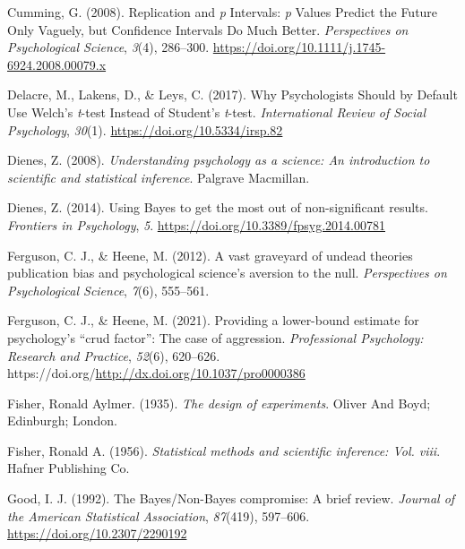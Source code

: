 \documentclass[
  letterpaper,
  DIV=11,
  numbers=noendperiod]{scrreprt}
\newlength{\cslhangindent}
\newlength{\cslentryspacingunit} %
\newenvironment{CSLReferences}[2] %
 {%
  \setlength{\parindent}{0pt}
  \ifodd #1
  \let\oldpar\par
  \def\par{\hangindent=\cslhangindent\oldpar}
  \fi
  \setlength{\parskip}{#2\cslentryspacingunit}
 }%
 {}
\begin{document}
\begin{CSLReferences}{1}{0}
\leavevmode{}%
Cumming, G. (2008). Replication and {\emph{p}} {Intervals}: {\emph{p}}
{Values Predict} the {Future Only Vaguely}, but {Confidence Intervals Do
Much Better}. \emph{Perspectives on Psychological Science}, \emph{3}(4),
286--300. \url{https://doi.org/10.1111/j.1745-6924.2008.00079.x}

\leavevmode{}%
Delacre, M., Lakens, D., \& Leys, C. (2017). Why {Psychologists Should}
by {Default Use Welch}'s {\emph{t}}-test {Instead} of {Student}'s
{\emph{t}}-test. \emph{International Review of Social Psychology},
\emph{30}(1). \url{https://doi.org/10.5334/irsp.82}

\leavevmode{}%
Dienes, Z. (2008). \emph{Understanding psychology as a science: {An}
introduction to scientific and statistical inference}. {Palgrave
Macmillan}.

\leavevmode{}%
Dienes, Z. (2014). Using {Bayes} to get the most out of non-significant
results. \emph{Frontiers in Psychology}, \emph{5}.
\url{https://doi.org/10.3389/fpsyg.2014.00781}

\leavevmode{}%
Ferguson, C. J., \& Heene, M. (2012). A vast graveyard of undead
theories publication bias and psychological science's aversion to the
null. \emph{Perspectives on Psychological Science}, \emph{7}(6),
555--561.

\leavevmode{}%
Ferguson, C. J., \& Heene, M. (2021). Providing a lower-bound estimate
for psychology's {``crud factor''}: {The} case of aggression.
\emph{Professional Psychology: Research and Practice}, \emph{52}(6),
620--626. https://doi.org/\url{http://dx.doi.org/10.1037/pro0000386}

\leavevmode{}%
Fisher, Ronald Aylmer. (1935). \emph{The design of experiments}. {Oliver
And Boyd; Edinburgh; London}.

\leavevmode{}%
Fisher, Ronald A. (1956). \emph{Statistical methods and scientific
inference: Vol. viii}. {Hafner Publishing Co.}

\leavevmode{}%
Good, I. J. (1992). The {Bayes}/{Non-Bayes} compromise: {A} brief
review. \emph{Journal of the American Statistical Association},
\emph{87}(419), 597--606. \url{https://doi.org/10.2307/2290192}


\end{CSLReferences}
\end{document}
